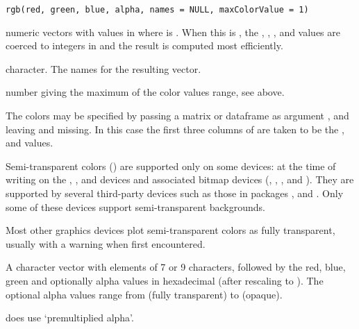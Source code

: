 %
\begin{Usage}
\begin{verbatim}
rgb(red, green, blue, alpha, names = NULL, maxColorValue = 1)
\end{verbatim}
\end{Usage}
%
\begin{Arguments}
\begin{ldescription}
\item[\code{red, blue, green, alpha}] numeric vectors with values in \eqn{[0, M]}{}
where  is .  When this is , the
, , , and 
values are coerced to integers in  and the result is
computed most efficiently.
\item[\code{names}] character. The names for the resulting vector.
\item[\code{maxColorValue}] number giving the maximum of the color values
range, see above.
\end{ldescription}
\end{Arguments}
%
\begin{Details}\relax
The colors may be specified by passing a matrix or dataframe as argument
, and leaving  and  missing.
In this case the first three columns of  are taken to be
the ,  and  values.

Semi-transparent colors () are supported only on
some devices: at the time of writing on the ,
,  and  devices and
associated bitmap devices (, , ,
 and ). They are supported by several
third-party devices such as those in packages ,
 and .  Only some of these
devices support semi-transparent backgrounds.

Most other graphics devices plot semi-transparent colors as fully
transparent, usually with a warning when first encountered.
\end{Details}
%
\begin{Value}
A character vector with elements of 7 or 9 characters, 
followed by the red, blue, green and optionally alpha values in
hexadecimal (after rescaling to ).  The optional alpha
values range from  (fully transparent) to  (opaque).

\R{} does  use `premultiplied alpha'.
\end{Value}
